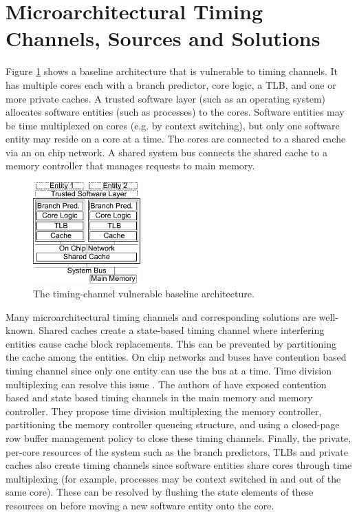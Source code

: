 \section{Microarchitectural Timing Channels, Sources and Solutions}
Figure \ref{fig:baseline} shows a baseline architecture that is vulnerable to 
timing channels. It has multiple cores each with a branch predictor, core 
logic, a TLB, and one or more private caches. A trusted software layer (such as 
an operating system) allocates software entities (such as processes) to the 
cores. Software entities may be time multiplexed on cores (e.g. by context 
switching), but only one software entity may reside on a core at a time. The 
cores are connected to a shared cache via an on chip network. A shared system 
bus connects the shared cache to a memory controller that manages requests to 
main memory.
    \begin{figure}
        \begin{center}
            \includegraphics[width=1.62in]{figs/baseline.pdf}
            \caption{The timing-channel vulnerable baseline architecture.}
            \label{fig:baseline}
        \end{center}
    \end{figure}


Many microarchitectural timing channels and corresponding solutions are 
well-known. Shared caches create a state-based timing channel where interfering 
entities cause cache block replacements. This can be prevented by partitioning 
the cache among the entities. On chip networks and buses have contention based 
timing channel since only one entity can use the bus at a time. Time division 
multiplexing can resolve this issue \cite{yaonocs}. The authors of 
\cite{ushpca14} have exposed contention based and state based timing channels 
in the main memory and memory controller. They propose time division 
multiplexing the memory controller, partitioning the memory controller queueing 
structure, and using a closed-page row buffer management policy to close these 
timing channels. Finally, the private, per-core resources of the system such as 
the branch predictors, TLBs and private caches also create timing channels 
since software entities share cores through time multiplexing (for example, 
processes may be context switched in and out of the same core). These can be 
resolved by flushing the state elements of these resources on before moving a 
new software entity onto the core.

